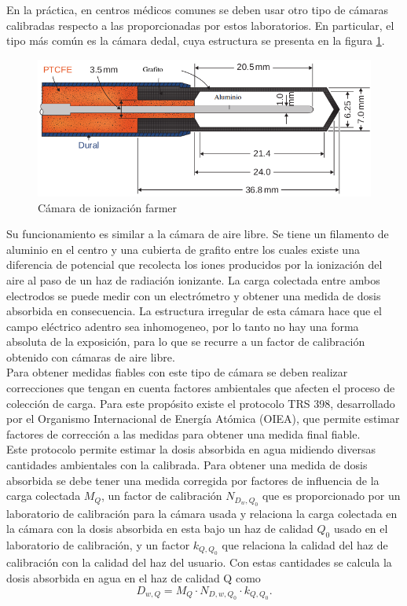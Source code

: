 En la práctica, en centros médicos comunes se deben usar otro tipo de cámaras calibradas respecto a las proporcionadas por estos laboratorios. En particular, el tipo más común es la cámara dedal, cuya estructura se presenta en la figura \ref{fig:farmer}.\\

\begin{figure}[H]
	\centering
	\includegraphics[width=0.7\linewidth]{images/camaraIoni.png}
	\caption{Cámara de ionización farmer\cite{khan2014the}}
	\label{fig:farmer}
\end{figure}

Su funcionamiento es similar a la cámara de aire libre. Se tiene un filamento de aluminio en el centro y una cubierta de grafito entre los cuales existe una diferencia de potencial que recolecta los iones producidos por la ionización del aire al paso de un haz de radiación ionizante. La carga colectada entre ambos electrodos se puede medir con un electrómetro y obtener una medida de dosis absorbida en consecuencia. La estructura irregular de esta  cámara hace que el campo eléctrico adentro sea inhomogeneo, por lo tanto no hay una forma absoluta de la exposición, para lo que se recurre a un factor de calibración obtenido con cámaras de aire libre.\\

Para obtener medidas fiables con este tipo de cámara se deben realizar correcciones que tengan en cuenta factores ambientales que afecten el proceso de colección de carga. Para este propósito existe el protocolo TRS 398, desarrollado por el Organismo Internacional de Energía Atómica (OIEA), que permite estimar factores de corrección a las medidas para obtener una medida final fiable.\\

Este protocolo permite estimar la dosis absorbida en agua midiendo diversas cantidades ambientales con la calibrada. Para obtener una medida de dosis absorbida se debe tener una medida corregida por factores de influencia de la carga colectada $M_{Q}$, un factor de calibración $N_{D_{w},Q_{0}}$ que es proporcionado por un laboratorio de calibración para la cámara usada y relaciona la carga colectada en la cámara con la dosis absorbida en esta bajo un haz de calidad $Q_0$ usado en el laboratorio de calibración, y un factor $k_{Q,Q_{0}}$ que relaciona la calidad del haz de calibración con la calidad del haz del usuario. Con estas cantidades se calcula la dosis absorbida en agua en el haz de calidad Q como
\begin{equation}
D_{w,Q}=M_{Q}\cdot N_{D,w,Q_{0}}\cdot k_{Q,Q_{0}}.
\end{equation}

